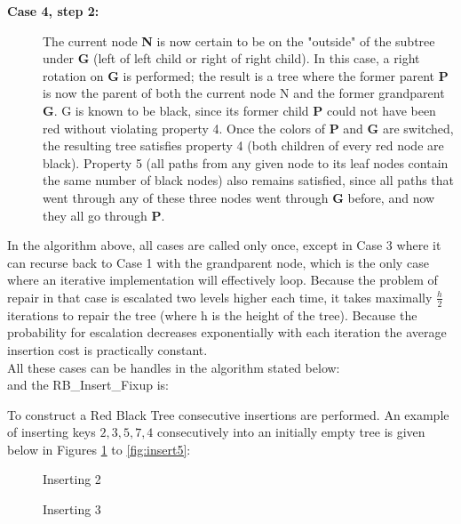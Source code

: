 \documentclass{article}[10pt]
\begin{document}
\begin{description}
    \item[\textbf{Case 4, step 2:}]    
                The current node \textbf{N} is now certain to be on the "outside" of the subtree under \textbf{G} (left of left child or right of right child). In this case, a right rotation on \textbf{G} is performed; the result is a tree where the former parent \textbf{P} is now the parent of both the current node N and the former grandparent \textbf{G}. G is known to be black, since its former child \textbf{P} could not have been red without violating property 4. Once the colors of \textbf{P} and \textbf{G} are switched, the resulting tree satisfies property 4 (both children of every red node are black). Property 5 (all paths from any given node to its leaf nodes contain the same number of black nodes) also remains satisfied, since all paths that went through any of these three nodes went through \textbf{G} before, and now they all go through \textbf{P}.
\end{description}
In the algorithm\cite{introAlgo} above, all cases are called only once, except in Case 3 where it can recurse back to Case 1 with the grandparent node, which is the only case where an iterative implementation will effectively loop. Because the problem of repair in that case is escalated two levels higher each time, it takes maximally $\frac{h}{2}$ iterations to repair the tree (where h is the height of the tree). Because the probability for escalation decreases exponentially with each iteration the average insertion cost is practically constant.\\
All these cases can be handles in the algorithm\cite{introAlgo} stated below:
\\

\vspace{0.5cm}
and the RB\_Insert\_Fixup is: \\

\vspace{0.5cm}

To construct a Red Black Tree consecutive insertions are performed. An example of inserting keys ${2,3,5,7,4}$ consecutively into an initially empty tree is given below in Figures \ref{fig:insert1} to \ref{fig:insert5}:

\begin{figure}[htbp]
	\centering
	
	\caption{Inserting 2} 
	\label{fig:insert1}
\end{figure}

\begin{figure}
	\centering
	
	\caption{Inserting 3}
	\label{fig:insert2}
\end{figure}
\end{document}
